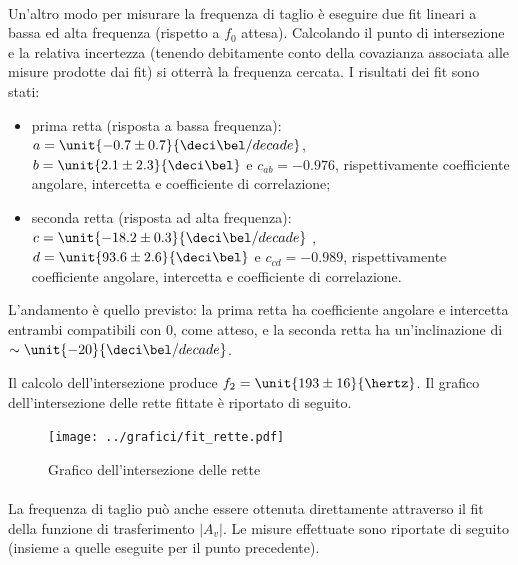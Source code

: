 \documentclass[10pt,a4paper]{article}
\begin{document}
\paragraph{} Un'altro modo per misurare la frequenza di taglio è eseguire due fit lineari a bassa ed alta frequenza (rispetto a $f_0$ attesa). Calcolando il punto di intersezione e la relativa incertezza (tenendo debitamente conto della covazianza associata alle misure prodotte dai fit) si otterrà la frequenza cercata. I risultati dei fit sono stati: 
\begin{itemize}
	\item prima retta (risposta a bassa frequenza):	 $a=\unit{-0.7 \pm 0.7}{\deci\bel/decade}$,  $b=\unit{2.1 \pm 2.3}{\deci\bel}$ e $c_{ab} = -0.976$, rispettivamente coefficiente angolare, intercetta e coefficiente di correlazione;
	\item seconda retta (risposta ad alta frequenza):	 $c=\unit{-18.2 \pm 0.3}{\deci\bel/decade}$ , $d=\unit{93.6 \pm 2.6}{\deci\bel}$ e $c_{cd} = -0.989$, rispettivamente coefficiente angolare, intercetta e coefficiente di correlazione.
\end{itemize}
L'andamento è quello previsto: la prima retta ha coefficiente angolare e intercetta entrambi compatibili con $0$, come atteso, e la seconda retta ha un'inclinazione di $\sim \unit{-20}{\deci\bel / decade}$.

Il calcolo dell'intersezione produce $f_2 =\unit{ 193 \pm 16}{\hertz}$.
Il grafico dell'intersezione delle rette fittate è riportato di seguito.
\begin{figure}[h!]
	\centering
	\texttt{[image: ../grafici/fit\_rette.pdf]}
	\caption{Grafico dell'intersezione delle rette}
\end{figure}

\paragraph{} La frequenza di taglio può anche essere ottenuta direttamente attraverso il fit della funzione di trasferimento $|A_v|$. Le misure effettuate sono riportate di seguito (insieme a quelle eseguite per il punto precedente).
\end{document}
